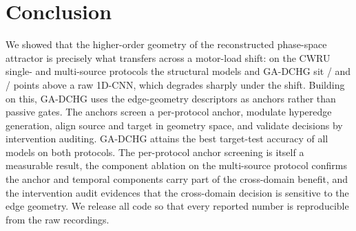 \section{Conclusion}
\label{sec:conclusion}

We showed that the higher-order geometry of the reconstructed phase-space
attractor is precisely what transfers across a motor-load shift: on the CWRU
single- and multi-source protocols the structural models and GA-DCHG sit
\GapCZeroThreeDynhg{}/\GapCZeroThreeGad{} and
\GapCZeroOneTwoThreeDynhg{}/\GapCZeroOneTwoThreeGad{} points above a raw 1D-CNN,
which degrades sharply under the shift. Building on this, GA-DCHG uses the
edge-geometry descriptors as anchors rather than passive gates. The anchors
screen a per-protocol anchor, modulate hyperedge generation, align source and
target in geometry space, and validate decisions by intervention auditing.
GA-DCHG attains the best target-test accuracy of all models on both protocols.
The per-protocol anchor screening is itself a measurable result, the component
ablation on the multi-source protocol confirms the anchor and temporal components
carry part of the cross-domain benefit, and the intervention audit evidences
that the cross-domain decision is sensitive to the edge geometry. We release
all code so that every reported number is reproducible from the raw recordings.
